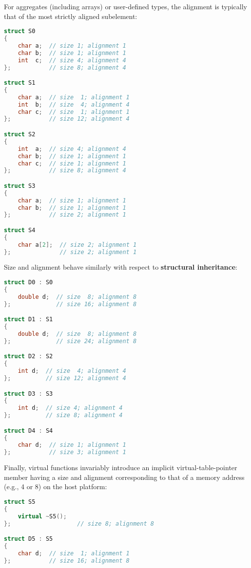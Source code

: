 \noindent For aggregates (including arrays) or user-defined types, the alignment
is typically that of the most strictly aligned subelement:

\begin{lstlisting}[language=C++]
struct S0
{
    char a;  // size 1; alignment 1
    char b;  // size 1; alignment 1
    int  c;  // size 4; alignment 4
};           // size 8; alignment 4

struct S1
{
    char a;  // size  1; alignment 1
    int  b;  // size  4; alignment 4
    char c;  // size  1; alignment 1
};           // size 12; alignment 4

struct S2
{
    int  a;  // size 4; alignment 4
    char b;  // size 1; alignment 1
    char c;  // size 1; alignment 1
};           // size 8; alignment 4

struct S3
{
    char a;  // size 1; alignment 1
    char b;  // size 1; alignment 1
};           // size 2; alignment 1

struct S4
{
    char a[2];  // size 2; alignment 1
};              // size 2; alignment 1
\end{lstlisting}
    
\noindent Size and alignment behave similarly with respect to \textbf{structural
inheritance}:

\begin{lstlisting}[language=C++]
struct D0 : S0
{
    double d;  // size  8; alignment 8
};             // size 16; alignment 8

struct D1 : S1
{
    double d;  // size  8; alignment 8
};             // size 24; alignment 8

struct D2 : S2
{
    int d;  // size  4; alignment 4
};          // size 12; alignment 4

struct D3 : S3
{
    int d;  // size 4; alignment 4
};          // size 8; alignment 4

struct D4 : S4
{
    char d;  // size 1; alignment 1
};           // size 3; alignment 1
\end{lstlisting}
    
\noindent Finally, virtual functions invariably introduce an implicit
virtual-table-pointer member having a size and alignment corresponding
to that of a memory address (e.g., 4 or 8) on the host platform:

\begin{lstlisting}[language=C++]
struct S5
{
    virtual ~S5();
};                   // size 8; alignment 8

struct D5 : S5
{
    char d;  // size  1; alignment 1
};           // size 16; alignment 8
\end{lstlisting}
    

